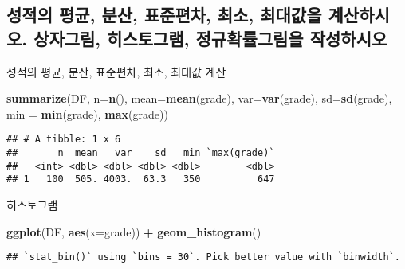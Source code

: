 \documentclass[
]{article}
\newenvironment{Shaded}{\begin{snugshade}}{\end{snugshade}}
\newcommand{\DataTypeTok}[1]{\textcolor[rgb]{0.13,0.29,0.53}{#1}}
\newcommand{\KeywordTok}[1]{\textcolor[rgb]{0.13,0.29,0.53}{\textbf{#1}}}
\newcommand{\NormalTok}[1]{#1}
\newcommand{\OperatorTok}[1]{\textcolor[rgb]{0.81,0.36,0.00}{\textbf{#1}}}
\newcommand{\StringTok}[1]{\textcolor[rgb]{0.31,0.60,0.02}{#1}}
\begin{document}
\hypertarget{uxc131uxc801uxc758-uxd3c9uxade0-uxbd84uxc0b0-uxd45cuxc900uxd3b8uxcc28-uxcd5cuxc18c-uxcd5cuxb300uxac12uxc744-uxacc4uxc0b0uxd558uxc2dcuxc624.-uxc0c1uxc790uxadf8uxb9bc-uxd788uxc2a4uxd1a0uxadf8uxb7a8-uxc815uxaddcuxd655uxb960uxadf8uxb9bcuxc744-uxc791uxc131uxd558uxc2dcuxc624}{%
\subsection{성적의 평균, 분산, 표준편차, 최소, 최대값을 계산하시오.
상자그림, 히스토그램, 정규확률그림을
작성하시오}\label{uxc131uxc801uxc758-uxd3c9uxade0-uxbd84uxc0b0-uxd45cuxc900uxd3b8uxcc28-uxcd5cuxc18c-uxcd5cuxb300uxac12uxc744-uxacc4uxc0b0uxd558uxc2dcuxc624.-uxc0c1uxc790uxadf8uxb9bc-uxd788uxc2a4uxd1a0uxadf8uxb7a8-uxc815uxaddcuxd655uxb960uxadf8uxb9bcuxc744-uxc791uxc131uxd558uxc2dcuxc624}}

성적의 평균, 분산, 표준편차, 최소, 최대값 계산

\begin{Shaded}
\begin{Highlighting}[]
\KeywordTok{summarize}\NormalTok{(DF, }\DataTypeTok{n=}\KeywordTok{n}\NormalTok{(), }\DataTypeTok{mean=}\KeywordTok{mean}\NormalTok{(grade), }\DataTypeTok{var=}\KeywordTok{var}\NormalTok{(grade), }\DataTypeTok{sd=}\KeywordTok{sd}\NormalTok{(grade), }\DataTypeTok{min =} \KeywordTok{min}\NormalTok{(grade), }\KeywordTok{max}\NormalTok{(grade))}
\end{Highlighting}
\end{Shaded}

\begin{verbatim}
## # A tibble: 1 x 6
##       n  mean   var    sd   min `max(grade)`
##   <int> <dbl> <dbl> <dbl> <dbl>        <dbl>
## 1   100  505. 4003.  63.3   350          647
\end{verbatim}

히스토그램

\begin{Shaded}
\begin{Highlighting}[]
\KeywordTok{ggplot}\NormalTok{(DF, }\KeywordTok{aes}\NormalTok{(}\DataTypeTok{x=}\NormalTok{grade)) }\OperatorTok{+}\StringTok{ }\KeywordTok{geom_histogram}\NormalTok{()}
\end{Highlighting}
\end{Shaded}

\begin{verbatim}
## `stat_bin()` using `bins = 30`. Pick better value with `binwidth`.
\end{verbatim}
\end{document}
